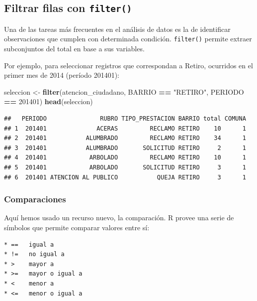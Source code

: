 \documentclass[spanish,]{book}
\newenvironment{Shaded}{\begin{snugshade}}{\end{snugshade}}
\newcommand{\DecValTok}[1]{\textcolor[rgb]{0.00,0.00,0.81}{#1}}
\newcommand{\KeywordTok}[1]{\textcolor[rgb]{0.13,0.29,0.53}{\textbf{#1}}}
\newcommand{\NormalTok}[1]{#1}
\newcommand{\OperatorTok}[1]{\textcolor[rgb]{0.81,0.36,0.00}{\textbf{#1}}}
\newcommand{\StringTok}[1]{\textcolor[rgb]{0.31,0.60,0.02}{#1}}
\begin{document}
\hypertarget{filtrar-filas-con-filter}{%
\subsection{\texorpdfstring{Filtrar filas con \texttt{filter()}}{Filtrar filas con filter()}}\label{filtrar-filas-con-filter}}

Una de las tareas más frecuentes en el análisis de datos es la de identificar observaciones que cumplen con determinada condición. \texttt{filter()} permite extraer subconjuntos del total en base a sus variables.

Por ejemplo, para seleccionar registros que correspondan a Retiro, ocurridos en el primer mes de 2014 (período 201401):

\begin{Shaded}
\begin{Highlighting}[]
\NormalTok{seleccion <-}\StringTok{ }\KeywordTok{filter}\NormalTok{(atencion_ciudadano, BARRIO }\OperatorTok{==}\StringTok{ "RETIRO"}\NormalTok{, PERIODO }\OperatorTok{==}\StringTok{ }\DecValTok{201401}\NormalTok{)}
\KeywordTok{head}\NormalTok{(seleccion)}
\end{Highlighting}
\end{Shaded}

\begin{verbatim}
##   PERIODO               RUBRO TIPO_PRESTACION BARRIO total COMUNA
## 1  201401              ACERAS         RECLAMO RETIRO    10      1
## 2  201401           ALUMBRADO         RECLAMO RETIRO    34      1
## 3  201401           ALUMBRADO       SOLICITUD RETIRO     2      1
## 4  201401            ARBOLADO         RECLAMO RETIRO    10      1
## 5  201401            ARBOLADO       SOLICITUD RETIRO     3      1
## 6  201401 ATENCION AL PUBLICO           QUEJA RETIRO     3      1
\end{verbatim}

\hypertarget{comparaciones}{%
\subsubsection{Comparaciones}\label{comparaciones}}

Aquí hemos usado un recurso nuevo, la comparación. R provee una serie de símbolos que permite comparar valores entre sí:

\begin{verbatim}
* ==   igual a 
* !=   no igual a 
* >    mayor a 
* >=   mayor o igual a 
* <    menor a 
* <=   menor o igual a 
\end{verbatim}
\end{document}

